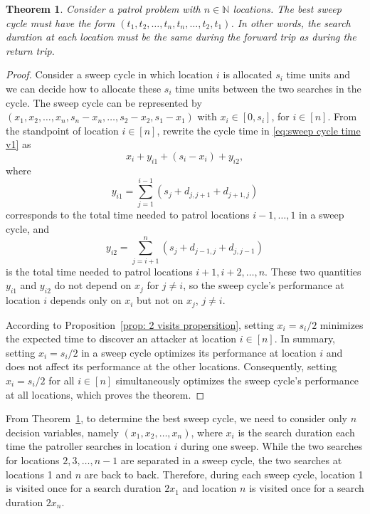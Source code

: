 \documentclass[11pt,a4paper]{article}
\newtheorem{theorem}{Theorem}[section]
\begin{document}
\begin{theorem} \label{Sweep Proof}
Consider a patrol problem with $n \in \mathbb{N}$ locations.
The best sweep cycle must have the form $(t_1, t_2, \ldots, t_n, t_n, \ldots, t_2, t_1)$.
In other words, the search duration at each location must be the same during the forward trip as during the return trip.
\end{theorem}
\begin{proof}
Consider a sweep cycle in which location $i$ is allocated $s_i$ time units and we can decide how to allocate these $s_i$ time units between the two searches in the cycle.
The sweep cycle can be represented by $(x_1, x_2, \ldots, x_n, s_n -x_n, \ldots, s_2 -x_2, s_1-x_1)$ with $x_i \in [0, s_i]$, for $i \in [n]$.
From the standpoint of location $i \in [n]$, rewrite the cycle time in \eqref{eq:sweep cycle time v1} as
\[
x_i + y_{i1} + (s_i - x_i) + y_{i2},
\]
where
\[
y_{i1} = \sum_{j=1}^{i-1} (s_j +  d_{j,j+1} + d_{j+1,j} )
\]
corresponds to the total time needed to patrol locations $i-1, \ldots, 1$ in a sweep cycle, and
\[
y_{i2} = \sum_{j=i+1}^n (s_j +  d_{j-1,j} + d_{j,j-1}) 
\]
is the total time needed to patrol locations $i+1, i+2, \ldots, n$.
These two quantities $y_{i1}$ and $y_{i2}$ do not depend on $x_j$ for $j \neq i$, so the sweep cycle's performance at location $i$ depends only on $x_i$ but not on $x_j$, $j \neq i$.

According to Proposition~\ref{prop: 2 visits propersition}, setting $x_i = s_i/2$ minimizes the expected time to discover an attacker at location $i \in [n]$.
In summary, setting $x_i = s_i/2$ in a sweep cycle optimizes its performance at location $i$ and does not affect its performance at the other locations.
Consequently, setting $x_i = s_i/2$ for all $i \in [n]$ simultaneously optimizes the sweep cycle's performance at all locations, which proves the theorem.
\end{proof}

From Theorem~\ref{Sweep Proof}, to determine the best sweep cycle, we need to consider only $n$ decision variables, namely $(x_1, x_2, \ldots, x_n)$, where $x_i$ is the search duration each time the patroller searches in location $i$ during one sweep.
While the two searches for locations $2, 3, \ldots, n-1$ are separated in a sweep cycle, the two searches at locations 1 and $n$ are back to back.
Therefore, during each sweep cycle, location 1 is visited once for a search duration $2 x_1$ and location $n$ is visited once for a search duration $2 x_n$.
\end{document}
